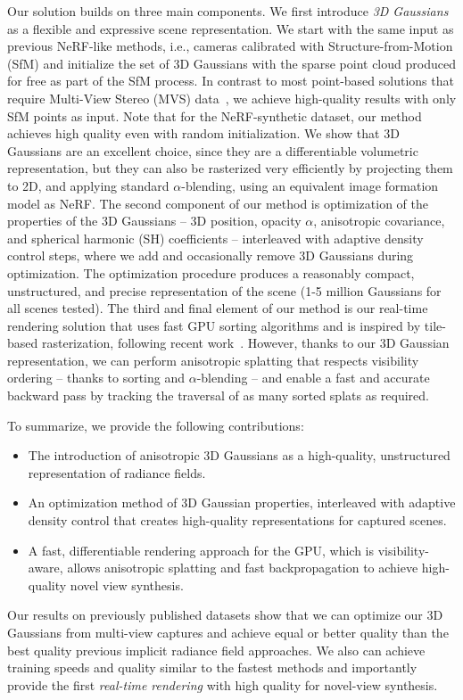 Our solution builds on three main components.  We first introduce \emph{3D Gaussians} as a flexible and expressive scene representation.
We start with the same input as previous NeRF-like methods, i.e., cameras calibrated with Structure-from-Motion (SfM) \cite{snavely2006photo} and initialize the set of 3D Gaussians with the sparse point cloud produced for free as part of the SfM process. In contrast to most point-based solutions that require Multi-View Stereo (MVS) data~\cite{aliev20,kopanas21,ruckert22}, we achieve high-quality results with only SfM points as input. Note that for the NeRF-synthetic dataset, our method achieves high quality even with random initialization.
We show that 3D Gaussians are an excellent choice, since they are a differentiable volumetric representation, but they can also be rasterized very efficiently by projecting them to 2D, and applying standard $\alpha$-blending, using an equivalent image formation model as NeRF.
The second component of our method is optimization of the properties of the 3D Gaussians -- 3D position, opacity $\alpha$, anisotropic covariance, and spherical harmonic (SH) coefficients -- interleaved with adaptive density control steps, where we add and occasionally remove 3D Gaussians during optimization. The optimization procedure produces a reasonably compact, unstructured, and precise representation of the scene (1-5 million Gaussians for all scenes tested).
The third and final element of our method is our real-time rendering solution that uses fast GPU sorting algorithms and is inspired by tile-based rasterization, following recent work~\cite{Lassner_2021_CVPR}. However, thanks to our 3D Gaussian representation, we can perform anisotropic splatting that respects visibility ordering -- thanks to sorting and $\alpha$-blending -- and enable a fast and accurate backward pass by tracking the traversal of as many sorted splats as required. 



\noindent
To summarize, we provide the following contributions:
\begin{itemize}
	\item The introduction of anisotropic 3D Gaussians as a high-quality, unstructured representation of radiance fields.
	\item An optimization method of 3D Gaussian properties, interleaved with adaptive density control that creates high-quality representations for captured scenes.
	\item A fast, differentiable rendering approach for the GPU, which is visibility-aware, allows anisotropic splatting and fast backpropagation to achieve high-quality novel view synthesis.
\end{itemize}

\noindent
Our results on previously published datasets show that we can optimize our 3D Gaussians from multi-view captures and achieve equal or better quality than the best quality previous implicit radiance field approaches. We also can achieve training speeds and quality similar to the fastest methods and importantly provide the first \emph{real-time rendering} with high quality for novel-view synthesis. 



